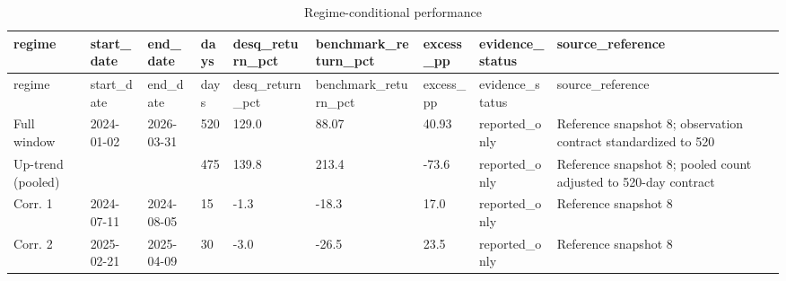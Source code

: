 \begin{landscape}
\begin{longtable}{lllllllll}
\caption{Regime-conditional performance}\label{tab:evaluation_8} \\
\toprule
regime & start\_date & end\_date & days & desq\_return\_pct & benchmark\_return\_pct & excess\_pp & evidence\_status & source\_reference \\
\midrule
\endfirsthead
\toprule
regime & start\_date & end\_date & days & desq\_return\_pct & benchmark\_return\_pct & excess\_pp & evidence\_status & source\_reference \\
\midrule
\endhead
Full window & 2024-01-02 & 2026-03-31 & 520 & 129.0 & 88.07 & 40.93 & reported\_only & Reference snapshot 8; observation contract standardized to 520 \\
Up-trend (pooled) &  &  & 475 & 139.8 & 213.4 & -73.6 & reported\_only & Reference snapshot 8; pooled count adjusted to 520-day contract \\
Corr. 1 & 2024-07-11 & 2024-08-05 & 15 & -1.3 & -18.3 & 17.0 & reported\_only & Reference snapshot 8 \\
Corr. 2 & 2025-02-21 & 2025-04-09 & 30 & -3.0 & -26.5 & 23.5 & reported\_only & Reference snapshot 8 \\
\bottomrule
\end{longtable}
\end{landscape}
